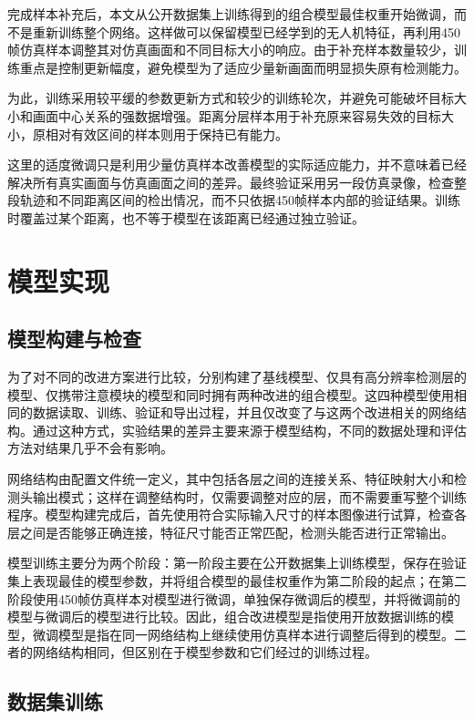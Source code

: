 完成样本补充后，本文从公开数据集上训练得到的组合模型最佳权重开始微调，而不是重新训练整个网络。这样做可以保留模型已经学到的无人机特征，再利用450帧仿真样本调整其对仿真画面和不同目标大小的响应。由于补充样本数量较少，训练重点是控制更新幅度，避免模型为了适应少量新画面而明显损失原有检测能力。

为此，训练采用较平缓的参数更新方式和较少的训练轮次，并避免可能破坏目标大小和画面中心关系的强数据增强。距离分层样本用于补充原来容易失效的目标大小，原相对有效区间的样本则用于保持已有能力。

这里的适度微调只是利用少量仿真样本改善模型的实际适应能力，并不意味着已经解决所有真实画面与仿真画面之间的差异。最终验证采用另一段仿真录像，检查整段轨迹和不同距离区间的检出情况，而不只依据450帧样本内部的验证结果。训练时覆盖过某个距离，也不等于模型在该距离已经通过独立验证。

\section{模型实现}
\label{sec:ch5_implementation}

\subsection{模型构建与检查}
\label{subsec:ch5_build}

为了对不同的改进方案进行比较，分别构建了基线模型、仅具有高分辨率检测层的模型、仅携带注意模块的模型和同时拥有两种改进的组合模型。这四种模型使用相同的数据读取、训练、验证和导出过程，并且仅改变了与这两个改进相关的网络结构。通过这种方式，实验结果的差异主要来源于模型结构，不同的数据处理和评估方法对结果几乎不会有影响。

网络结构由配置文件统一定义，其中包括各层之间的连接关系、特征映射大小和检测头输出模式；这样在调整结构时，仅需要调整对应的层，而不需要重写整个训练程序。模型构建完成后，首先使用符合实际输入尺寸的样本图像进行试算，检查各层之间是否能够正确连接，特征尺寸能否正常匹配，检测头能否进行正常输出。

模型训练主要分为两个阶段：第一阶段主要在公开数据集上训练模型，保存在验证集上表现最佳的模型参数，并将组合模型的最佳权重作为第二阶段的起点；在第二阶段使用450帧仿真样本对模型进行微调，单独保存微调后的模型，并将微调前的模型与微调后的模型进行比较。因此，组合改进模型是指使用开放数据训练的模型，微调模型是指在同一网络结构上继续使用仿真样本进行调整后得到的模型。二者的网络结构相同，但区别在于模型参数和它们经过的训练过程。

\subsection{数据集训练}
\label{subsec:ch5_train}

